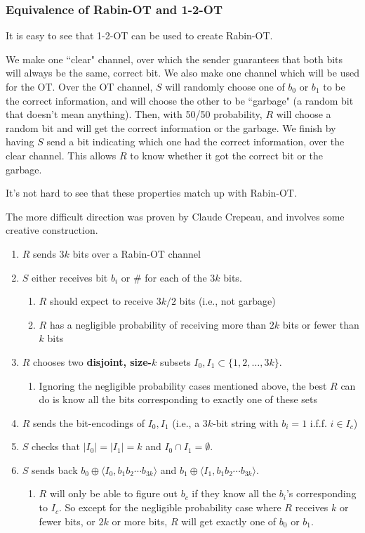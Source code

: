 \documentclass[11pt]{article}
\newcommand{\tb}{\textbf}
\begin{document}
\subsubsection{Equivalence of Rabin-OT and 1-2-OT}
It is easy to see that 1-2-OT can be used to create Rabin-OT.

We make one ``clear" channel, over which the sender guarantees that both bits will always be the same, correct bit.
We also make one channel which will be used for the OT.
Over the OT channel, \(S\) will randomly choose one of \(b_0\) or \(b_1\) to be the correct information, and will choose the other to be ``garbage" (a random bit that doesn't mean anything).
Then, with 50/50 probability, \(R\) will choose a random bit and will get the correct information or the garbage.
We finish by having \(S\) send a bit indicating which one had the correct information, over the clear channel.
This allows \(R\) to know whether it got the correct bit or the garbage.

It's not hard to see that these properties match up with Rabin-OT.\medskip

\newpage
The more difficult direction was proven by Claude Crepeau, and involves some creative construction.
\begin{enumerate}
\item \(R\) sends \(3k\) bits over a Rabin-OT channel
\item \(S\) either receives bit \(b_i\) or \(\#\) for each of the \(3k\) bits.
\begin{enumerate}
\item \(R\) should expect to receive \(3k/2\) bits (i.e., not garbage)
\item \(R\) has a negligible probability of receiving more than \(2k\) bits or fewer than \(k\) bits
\end{enumerate}
\item \(R\) chooses two \tb{disjoint, size-\(k\)} subsets \(I_0,I_1\subset \{1,2,\ldots,3k\}\).
\begin{enumerate}
\item Ignoring the negligible probability cases mentioned above, the best \(R\) can do is know all the bits corresponding to exactly one of these sets
\end{enumerate}
\item \(R\) sends the bit-encodings of \(I_0,I_1\) (i.e., a \(3k\)-bit string with \(b_i=1\) i.f.f. \(i\in I_c\))
\item \(S\) checks that \(|I_0|=|I_1|=k\) and \(I_0\cap I_1=\emptyset\).
\item \(S\) sends back \(b_0\oplus\langle I_0, b_1b_2\cdots b_{3k}\rangle\) and \(b_1\oplus\langle I_1, b_1b_2\cdots b_{3k}\rangle\).
\begin{enumerate}
\item \(R\) will only be able to figure out \(b_c\) if they know all the \(b_i\)'s corresponding to \(I_c\). 
So except for the negligible probability case where \(R\) receives \(k\) or fewer bits, or \(2k\) or more bits, \(R\) will get exactly one of \(b_0\) or \(b_1\).
\end{enumerate}
\end{enumerate}
\end{document}
